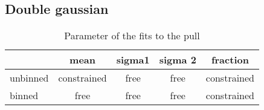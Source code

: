 \documentclass[41pt,a4paper,oneside]{report}
\begin{document}



\subsection{Double gaussian}
\label{sec:DoubleGauss}

\begin{table*}[bH]
\begin{center}
\caption{Parameter of the fits to the pull}
\begin{tabular}{l | c c c c }
\hline
         & mean & sigma1 & sigma 2 & fraction \\
\hline
unbinned &  constrained & free & free & constrained  \\
binned   &  free &  free  & free &  constrained \\
\hline
\hline
\end{tabular}
    \label{tab:ParamDoubleGFit}
\end{center}
\end{table*}
\end{document}
